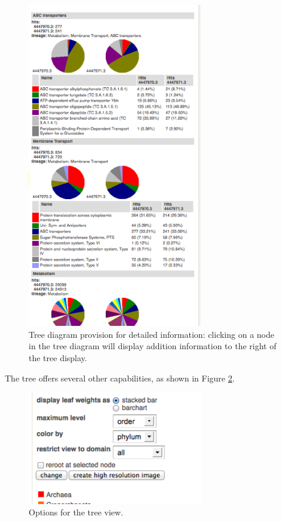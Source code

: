 \documentclass[12pt,fullpage]{report}
\begin{document}
\begin{figure}
\begin{center}
\includegraphics[width=3in]{Images/analysis-page-tree-additional-bar-charts.png}
\end{center}
\caption{
Tree diagram provision for detailed information: 
clicking on a node in the tree diagram will display addition information to the right of the tree display.
}
\label{fig:analysis-page-tree-additional-bar-charts}
\end{figure}


The tree offers several other capabilities, as shown in Figure \ref{fig:analysis-page-tree-options}.

\begin{figure}[ht]
\begin{center}
\includegraphics[width=3in]{Images/analysis-page-tree-options.png}
\end{center}
\caption{
Options for the tree view.
}
\label{fig:analysis-page-tree-options}
\end{figure}
\end{document}
